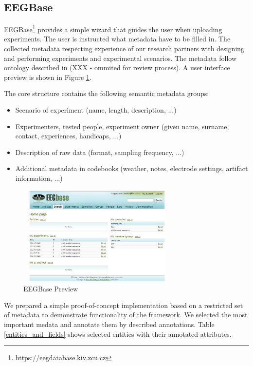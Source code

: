 \documentclass[a4paper,twoside]{article}
\begin{document}
\subsection{EEGBase} \label{Portal}



EEGBase\footnote{https://eegdatabase.kiv.zcu.cz} provides a simple wizard that guides the user when uploading experiments. The user is instructed what metadata have to be filled in. The collected metadata respecting experience of our research partners with designing and performing experiments and experimental scenarios. The metadata follow ontology described in (XXX - ommited for review process). A user interface preview is shown in Figure \ref{portal}.

The core structure contains the following semantic metadata groups:

\begin{itemize}
\item Scenario of experiment (name, length, description, ...)
\item Experimenters, tested people, experiment owner (given name, surname, contact, experiences, handicaps, ...)
\item Description of raw data (format, sampling frequency, ...)
\item Additional metadata in codebooks (weather, notes, electrode settings, artifact information, ...)
\end{itemize}


\begin{figure}
\centering\includegraphics[width=8cm, height=5cm]{portal_preview}
\caption{\label{portal}EEGBase Preview}

\end{figure}

We prepared a simple proof-of-concept implementation based on a restricted set of metadata to demonstrate functionality of the framework. We selected the most important medata and annotate them by described annotations. Table \ref{entities_and_fields} shows selected entities with their annotated attributes.
\end{document}
